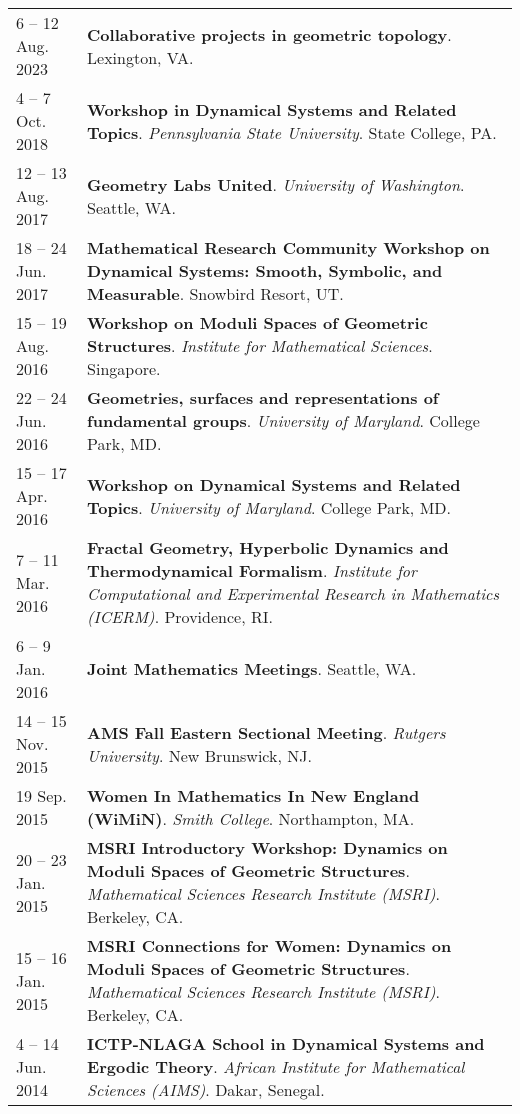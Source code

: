     \begin{center}
    {
    \renewcommand{\arraystretch}{1.5}
    \begin{longtable}{p{}  p{}}
    6  -- 12 Aug.  2023 & \textbf{Collaborative projects in geometric topology}.  Lexington, VA.  \\ 
4  -- 7 Oct.  2018 & \textbf{Workshop in Dynamical Systems and Related Topics}. \textit{Pennsylvania State University}.  State College, PA.  \\ 
12  -- 13 Aug.  2017 & \textbf{Geometry Labs United}. \textit{University of Washington}.  Seattle, WA.  \\ 
18  -- 24 Jun.  2017 & \textbf{Mathematical Research Community Workshop on Dynamical Systems:
Smooth, Symbolic, and Measurable}.  Snowbird Resort, UT.  \\ 
15  -- 19 Aug.  2016 & \textbf{Workshop on Moduli Spaces of Geometric Structures}. \textit{Institute for Mathematical Sciences}.  Singapore.  \\ 
22  -- 24 Jun.  2016 & \textbf{Geometries, surfaces and representations of fundamental groups}. \textit{University of Maryland}.  College Park, MD.  \\ 
15  -- 17 Apr.  2016 & \textbf{Workshop on Dynamical Systems and Related Topics}. \textit{University of Maryland}.  College Park, MD.  \\ 
7  -- 11 Mar.  2016 & \textbf{Fractal Geometry, Hyperbolic Dynamics and Thermodynamical Formalism}. \textit{Institute for Computational and Experimental Research in Mathematics (ICERM)}.  Providence, RI.  \\ 
6  -- 9 Jan.  2016 & \textbf{Joint Mathematics Meetings}.  Seattle, WA.  \\ 
14  -- 15 Nov.  2015 & \textbf{AMS Fall Eastern Sectional Meeting}. \textit{Rutgers University}.  New Brunswick, NJ.  \\ 
19 Sep.  2015 & \textbf{Women In Mathematics In New England (WiMiN)}. \textit{Smith College}.  Northampton, MA.  \\ 
20  -- 23 Jan.  2015 & \textbf{MSRI Introductory Workshop: Dynamics on Moduli Spaces of Geometric Structures}. \textit{Mathematical Sciences Research Institute (MSRI)}.  Berkeley, CA.  \\ 
15  -- 16 Jan.  2015 & \textbf{MSRI Connections for Women: Dynamics on Moduli Spaces of Geometric Structures}. \textit{Mathematical Sciences Research Institute (MSRI)}.  Berkeley, CA.  \\ 
4  -- 14 Jun.  2014 & \textbf{ICTP-NLAGA School in Dynamical Systems and Ergodic Theory}. \textit{African Institute for Mathematical Sciences (AIMS)}.  Dakar, Senegal.  \\ 

\end{longtable}}
\end{center}
